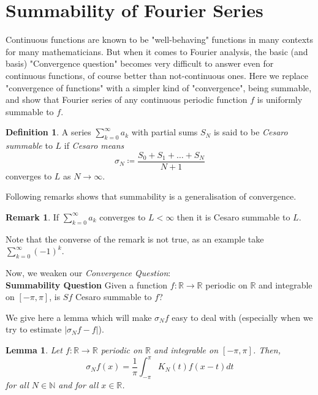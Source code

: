 \documentclass[12pt]{amsart}
\newtheorem{lemma}[theorem]{Lemma}
\theoremstyle{definition}
\newtheorem{definition}[theorem]{Definition}
\newtheorem{remark}[theorem]{Remark}
\begin{document}
\section{Summability of Fourier Series}


Continuous functions are known to be "well-behaving" functions in many contexts for many mathematicians. But when it comes to Fourier analysis, the basic (and basis) "Convergence question" becomes very difficult to answer even for continuous functions, of course better than not-continuous ones. Here we replace "convergence of functions" with a simpler kind of "convergence", being summable, and show that Fourier series of any continuous periodic function \(f\) is uniformly summable to \(f\).


\begin{definition}
    A series $\sum_{k=0}^{\infty} a_k$ with partial sums $S_N$ is said to be \textit{Cesaro summable} to $L$ if \textit{Cesaro means}
    \[
    \sigma_N \coloneqq   \frac{S_0 + S_1 + \dots + S_N }{N+1}
    \]
    converges to $L$ as $N \longrightarrow \infty$.
\end{definition}


Following remarks shows that summability is a generalisation of convergence.


\begin{remark}\label{convergence to the same value to the summable limit}
    If $\sum_{k=0}^{\infty} a_k$ converges to $L < \infty$ then it is Cesaro summable to $L$.
\end{remark}


Note that the converse of the remark is not true, as an example take $\sum_{k = 0}^{\infty} (-1) ^ k$.\par


Now, we weaken our \textit{Convergence Question}: \\


\textbf{Summability Question} Given a function $f: \mathbb{R} \xrightarrow{} \mathbb{R} $ periodic on $\mathbb{R}$ and integrable on $[-\pi, \pi]$, is $Sf$ Cesaro summable to \(f\)?\par
We give here a lemma which will make $\sigma_N f$ easy to deal with (especially when we try to estimate $|\sigma_N f - f|$).


\begin{lemma}
    Let $f: \mathbb{R} \xrightarrow{} \mathbb{R} $ periodic on $\mathbb{R}$ and integrable on $[-\pi, \pi]$. Then,
    \[
    \sigma_Nf(x) = \frac{1}{\pi} \int_{-\pi}^{\pi} K_N(t)f(x-t)dt
    \]
    for all $N \in \mathbb{N}$ and for all $ x \in \mathbb{R}$.\footnotemark{}
\end{lemma}
\end{document}
